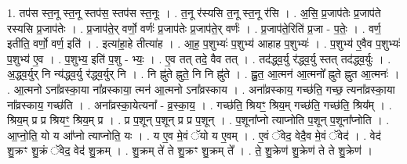 \documentclass[17pt]{extarticle}
\begin{document}
1. तप॑स स्त॒नू स्त॒नू स्तप॑स॒ स्तप॑स स्त॒नूः । . त॒नू र॑स्यसि त॒नू स्त॒नू र॑सि । . अ॒सि॒ प्र॒जाप॑तेः प्र॒जाप॑ते रस्यसि प्र॒जाप॑तेः । . प्र॒जाप॑ते॒र् वर्णो॒ वर्णः॑ प्र॒जाप॑तेः प्र॒जाप॑ते॒र् वर्णः॑ । . प्र॒जाप॑ते॒रिति॑ प्र॒जा - प॒तेः॒ । . वर्ण॒ इतीति॒ वर्णो॒ वर्ण॒ इति॑ । . इत्या॑हा॒हे तीत्या॑ह । . आ॒ह॒ प॒शुभ्यः॑ प॒शुभ्य॑ आहाह प॒शुभ्यः॑ । . प॒शुभ्य॑ ए॒वैव प॒शुभ्यः॑ प॒शुभ्य॑ ए॒व । . प॒शुभ्य॒ इति॑ प॒शु - भ्यः॒ । . ए॒व तत् तदे॒ वैव तत् । . तद॑द्ध्व॒र्यु र॑द्ध्व॒र्यु स्तत् तद॑द्ध्व॒र्युः । . अ॒द्ध्व॒र्युर् नि न्य॑द्ध्व॒र्यु र॑द्ध्व॒र्युर् नि । . नि ह्नु॑ते ह्नुते॒ नि नि ह्नु॑ते । . ह्नु॒त॒ आ॒त्मन॑ आ॒त्मनो᳚ ह्नुते ह्नुत आ॒त्मनः॑ । . आ॒त्मनो ऽना᳚व्रस्का॒या ना᳚व्रस्काया॒ त्मन॑ आ॒त्मनो ऽना᳚व्रस्काय । . अना᳚व्रस्काय॒ गच्छ॑ति॒ गच्छ॒ त्यना᳚व्रस्का॒या ना᳚व्रस्काय॒ गच्छ॑ति । . अना᳚व्रस्का॒येत्यना᳚ - व्र॒स्का॒य॒ । . गच्छ॑ति॒ श्रियꣳ॒॒ श्रिय॒म् गच्छ॑ति॒ गच्छ॑ति॒ श्रिय᳚म् । . श्रिय॒म् प्र प्र श्रियꣳ॒॒ श्रिय॒म् प्र । . प्र प॒शून् प॒शून् प्र प्र प॒शून् । . प॒शूना᳚प्नो त्याप्नोति प॒शून् प॒शूना᳚प्नोति । . आ॒प्नो॒ति॒ यो य आ᳚प्नो त्याप्नोति॒ यः । . य ए॒व मे॒वं ॅयो य ए॒वम् । . ए॒वं ॅवेद॒ वेदै॒व मे॒वं ॅवेद॑ । . वेद॑ शु॒क्रꣳ शु॒क्रं ॅवेद॒ वेद॑ शु॒क्रम् । . शु॒क्रम् ते॑ ते शु॒क्रꣳ शु॒क्रम् ते᳚ । . ते॒ शु॒क्रेण॑ शु॒क्रेण॑ ते ते शु॒क्रेण॑ । \newline
\end{document}
